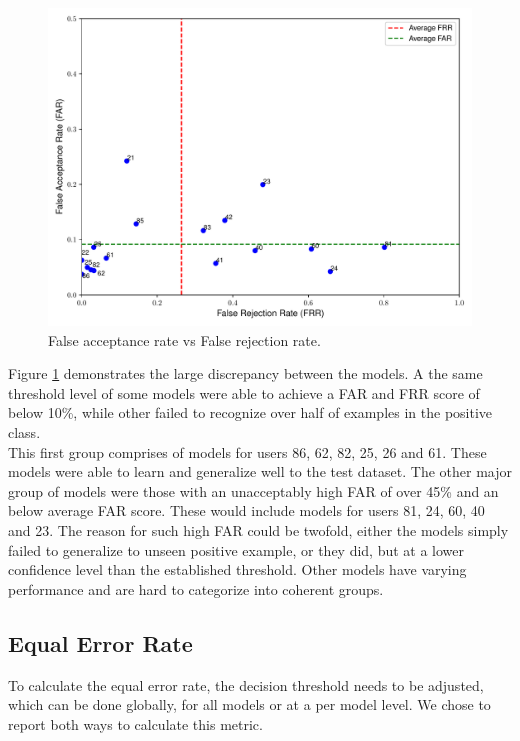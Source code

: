 \begin{figure}[H]
	\centering
	\includegraphics[width=\textwidth]{images/far_vs_frr.pdf} 	
	\caption{False acceptance rate vs False rejection rate.}
	\label{fig:frr_vs_far_all_models_base}
\end{figure}

Figure \ref{fig:frr_vs_far_all_models_base} demonstrates the large discrepancy between the models. A the same threshold level of some models were able to achieve a FAR and FRR score of below 10\%, while other failed to recognize over half of examples in the positive class. \\
This first group comprises of models for users 86, 62, 82, 25, 26 and 61. These models were able to learn and generalize well to the test dataset.
The other major group of models were those with an unacceptably high FAR of over 45\% and an below average FAR score. These would include models for users 81, 24, 60, 40 and 23. The reason for such high FAR could be twofold, either the models simply failed to generalize to unseen positive example, or they did, but at a lower confidence level than the established threshold. Other models have varying performance and are hard to categorize into coherent groups.

\subsection{Equal Error Rate}
To calculate the equal error rate, the decision threshold needs to be adjusted, which can be done globally, for all models or at a per model level. We chose to report both ways to calculate this metric. 

